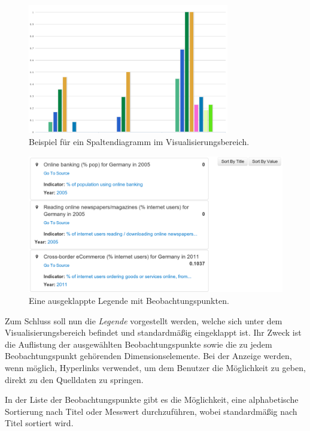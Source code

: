 \documentclass[11pt]{article}
\newcommand{\com}[1]{\marginpar{\em {\small{#1}}}} %
\begin{document}
%
%
\begin{figure}[h!]
    \centering
    \includegraphics[width=8.8cm]{CubeViz/Visualization.pdf}
    \caption{Beispiel für ein Spaltendiagramm im Visualisierungsbereich.}
    \label{fig:CubeViz_Visualization}
\end{figure}


%
%
\begin{figure}[h!]
    \centering
    \includegraphics[width=15cm]{CubeViz/LegendObservations.pdf}
    \caption{Eine ausgeklappte Legende mit Beobachtungspunkten.}
    \label{fig:CubeViz_LegendObservations}
\end{figure}

\noindent
Zum Schluss soll nun die \textit{Legende} vorgestellt werden,\com{Legende} welche sich unter dem Visualisierungsbereich befindet und standardmäßig eingeklappt ist. Ihr Zweck ist die Auflistung der ausgewählten Beobachtungspunkte sowie die zu jedem Beobachtungspunkt gehörenden Dimensionselemente. Bei der Anzeige werden, wenn möglich, Hyperlinks verwendet, um dem Benutzer die Möglichkeit zu geben, direkt zu den Quelldaten zu springen. 

In der Liste der Beobachtungspunkte gibt es die Möglichkeit, eine alphabetische Sortierung nach Titel oder Messwert durchzuführen, wobei standardmäßig nach Titel sortiert wird. 
\end{document}

